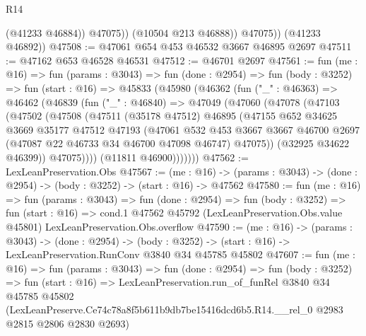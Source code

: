 \begin{lexlean}{R14}
\begin{coremodule}
                  (@41233 @46884))
                @47075))
            (@10504 @213 @46888))
          @47075))
      (@41233 @46892))
@47508 := @47061 @654 @453 @46532 @3667 @46895 @2697
@47511 := @47162 @653 @46528 @46531
@47512 := @46701 @2697
@47561 := fun (me : @16) =>
  fun (params : @3043) =>
  fun (done : @2954) =>
  fun (body : @3252) =>
  fun (start : @16) =>
  @45833
    (@45980
      (@46362
        (fun ("_" : @46363) =>
        @46462
          (@46839
            (fun ("_" : @46840) =>
            @47049
              (@47060
                (@47078
                  (@47103
                    (@47502
                      (@47508
                        (@47511
                          (@35178 @47512)
                          @46895
                          (@47155
                            @652
                            @34625
                            @3669
                            @35177
                            @47512
                            @47193
                            (@47061
                              @532
                              @453
                              @3667
                              @3667
                              @46700
                              @2697
                              (@47087 @22 @46733 @34 @46700 @47098 @46747)
                              @47075))
                          (@32925 @34622 @46399))
                        @47075))))
                (@11811 @46900)))))))
@47562 := LexLeanPreservation.Obs
@47567 := (me : @16) ->
  (params : @3043) -> (done : @2954) -> (body : @3252) -> (start : @16) -> @47562
@47580 := fun (me : @16) =>
  fun (params : @3043) =>
  fun (done : @2954) =>
  fun (body : @3252) =>
  fun (start : @16) =>
  cond.{1} @47562 @45792 (LexLeanPreservation.Obs.value @45801) LexLeanPreservation.Obs.overflow
@47590 := (me : @16) ->
  (params : @3043) ->
  (done : @2954) ->
  (body : @3252) -> (start : @16) -> LexLeanPreservation.RunConv @3840 @34 @45785 @45802
@47607 := fun (me : @16) =>
  fun (params : @3043) =>
  fun (done : @2954) =>
  fun (body : @3252) =>
  fun (start : @16) =>
  LexLeanPreservation.run_of_funRel
    @3840
    @34
    @45785
    @45802
    (LexLeanPreserve.Ce74c78a8f5b611b9db7be15416dcd6b5.R14.__rel_0 @2983 @2815 @2806 @2830 @2693)
\end{coremodule}
\end{lexlean}
